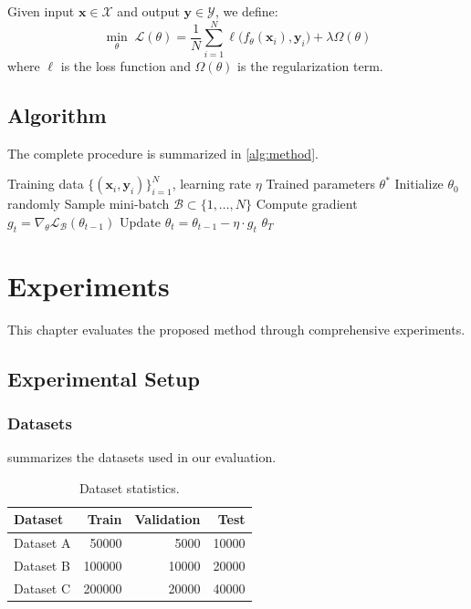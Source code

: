 \documentclass[12pt,a4paper,oneside]{book}
\theoremstyle{plain}
\theoremstyle{definition}
\theoremstyle{remark}
\begin{document}
Given input $\mathbf{x} \in \mathcal{X}$ and output $\mathbf{y} \in \mathcal{Y}$, we define:
\begin{equation}
    \label{eq:objective}
    \min_{\theta} \; \mathcal{L}(\theta) = \frac{1}{N} \sum_{i=1}^{N} \ell\bigl(f_\theta(\mathbf{x}_i), \mathbf{y}_i\bigr) + \lambda \Omega(\theta)
\end{equation}
where $\ell$ is the loss function and $\Omega(\theta)$ is the regularization term.

\section{Algorithm}

The complete procedure is summarized in \cref{alg:method}.

\begin{algorithm}[tbp]
\caption{Proposed Method}
\label{alg:method}
\begin{algorithmic}[1]
\Require Training data $\{(\mathbf{x}_i, \mathbf{y}_i)\}_{i=1}^N$, learning rate $\eta$
\Ensure Trained parameters $\theta^*$
\State Initialize $\theta_0$ randomly
    \State Sample mini-batch $\mathcal{B} \subset \{1, \ldots, N\}$
    \State Compute gradient $g_t = \nabla_\theta \mathcal{L}_\mathcal{B}(\theta_{t-1})$
    \State Update $\theta_t = \theta_{t-1} - \eta \cdot g_t$
\EndFor
\State \Return $\theta_T$
\end{algorithmic}
\end{algorithm}

\chapter{Experiments}
\label{ch:experiments}

This chapter evaluates the proposed method through comprehensive experiments.

\section{Experimental Setup}

\subsection{Datasets}

 summarizes the datasets used in our evaluation.

\begin{table}[tbp]
\centering
\caption{Dataset statistics.}
\label{tab:datasets}
\begin{tabular}{@{}lrrr@{}}
\toprule
\textbf{Dataset} & \textbf{Train} & \textbf{Validation} & \textbf{Test} \\
\midrule
Dataset A & \num{50000}  & \num{5000}  & \num{10000} \\
Dataset B & \num{100000} & \num{10000} & \num{20000} \\
Dataset C & \num{200000} & \num{20000} & \num{40000} \\
\bottomrule
\end{tabular}
\end{table}
\end{document}
